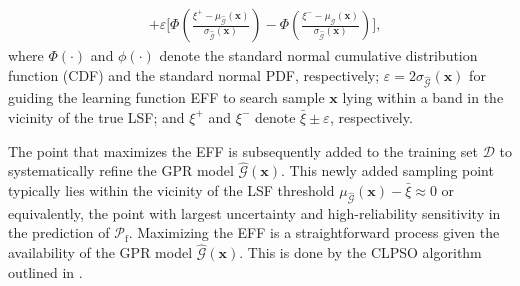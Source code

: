 \documentclass[preprint,3p]{elsarticle}
\begin{document}
\begin{linenumbers}
\begin{equation}
\begin{aligned}
        &+\varepsilon\Bigg[\Phi\left(\frac{\xi^{+}-\mu_{\widehat{\mathcal{G}}}(\textbf{x})}{\sigma_{\widehat{\mathcal{G}}}(\textbf{x})}\right)-\Phi\left(\frac{\xi^{-}-\mu_{\widehat{\mathcal{G}}}(\textbf{x})}{\sigma_{\widehat{\mathcal{G}}}(\textbf{x})}\right)\Bigg],
    \end{aligned}
\label{EQ:19}
\end{equation}
where $\Phi(\cdot)$ and $\phi(\cdot)$ denote the standard normal
cumulative distribution function (CDF) and the standard normal
PDF, respectively; $\varepsilon = 2\sigma_{\widehat{\mathcal{G}}}(\textbf{x})$ for
guiding the learning function EFF to search sample $\textbf{x}$
lying within a band in the vicinity of the true LSF; and $\xi^{+}$
and $\xi^{-}$ denote $\bar\xi\pm\varepsilon$, respectively.

The point that maximizes the EFF is subsequently added to the training set $\mathcal{D}$ to systematically refine the GPR model $\widehat{\mathcal{G}}(\textbf{x})$.
This newly added sampling point typically lies within the vicinity of the LSF threshold $\mu_{\widehat{\mathcal{G}}}(\textbf{x})-\bar\xi \approx0$ or equivalently, the point with largest uncertainty and high-reliability sensitivity in the prediction of $\mathcal{P}_\mathrm f$.
Maximizing the EFF is a straightforward process given the availability of the GPR model $\widehat{\mathcal{G}}(\textbf{x})$.
This is done by the CLPSO algorithm outlined in . 


\end{linenumbers}
\end{document}
